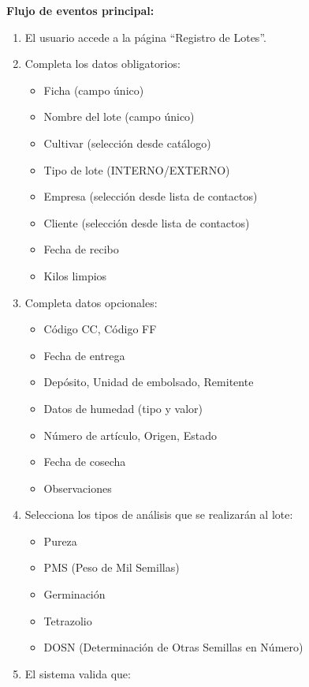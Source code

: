 \vspace{0.5em}
\noindent\textbf{Flujo de eventos principal:}
\begin{enumerate}[nosep]
    \item El usuario accede a la página ``Registro de Lotes''.
    \item Completa los datos obligatorios:
    \begin{itemize}[nosep]
        \item Ficha (campo único)
        \item Nombre del lote (campo único)
        \item Cultivar (selección desde catálogo)
        \item Tipo de lote (INTERNO/EXTERNO)
        \item Empresa (selección desde lista de contactos)
        \item Cliente (selección desde lista de contactos)
        \item Fecha de recibo
        \item Kilos limpios
    \end{itemize}
    \item Completa datos opcionales:
    \begin{itemize}[nosep]
        \item Código CC, Código FF
        \item Fecha de entrega
        \item Depósito, Unidad de embolsado, Remitente
        \item Datos de humedad (tipo y valor)
        \item Número de artículo, Origen, Estado
        \item Fecha de cosecha
        \item Observaciones
    \end{itemize}
    \item Selecciona los tipos de análisis que se realizarán al lote:
    \begin{itemize}[nosep]
        \item Pureza
        \item PMS (Peso de Mil Semillas)
        \item Germinación
        \item Tetrazolio
        \item DOSN (Determinación de Otras Semillas en Número)
    \end{itemize}
    \item El sistema valida que:
    \begin{itemize}[nosep]

\end{itemize}
\end{enumerate}

